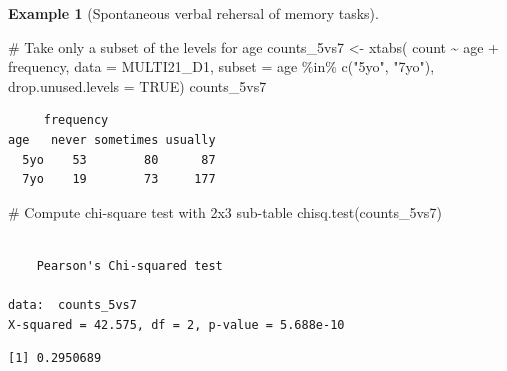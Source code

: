\documentclass[
  11pt,
  letterpaper,
]{scrbook}
\newenvironment{Shaded}{\begin{snugshade}}{\end{snugshade}}
\newcommand{\AttributeTok}[1]{\textcolor[rgb]{0.40,0.45,0.13}{#1}}
\newcommand{\CommentTok}[1]{\textcolor[rgb]{0.37,0.37,0.37}{#1}}
\newcommand{\ConstantTok}[1]{\textcolor[rgb]{0.56,0.35,0.01}{#1}}
\newcommand{\FunctionTok}[1]{\textcolor[rgb]{0.28,0.35,0.67}{#1}}
\newcommand{\NormalTok}[1]{\textcolor[rgb]{0.00,0.23,0.31}{#1}}
\newcommand{\OtherTok}[1]{\textcolor[rgb]{0.00,0.23,0.31}{#1}}
\newcommand{\SpecialCharTok}[1]{\textcolor[rgb]{0.37,0.37,0.37}{#1}}
\newcommand{\StringTok}[1]{\textcolor[rgb]{0.13,0.47,0.30}{#1}}
\theoremstyle{definition}
\newtheorem{example}{Example}[chapter]
\theoremstyle{definition}
\theoremstyle{remark}
\begin{document}
\begin{example}[Spontaneous verbal rehersal of memory
tasks]
\begin{Shaded}
\begin{Highlighting}[]
\CommentTok{\# Take only a subset of the levels for age}
\NormalTok{counts\_5vs7 }\OtherTok{\textless{}{-}} \FunctionTok{xtabs}\NormalTok{(}
\NormalTok{  count }\SpecialCharTok{\textasciitilde{}}\NormalTok{ age }\SpecialCharTok{+}\NormalTok{ frequency, }
  \AttributeTok{data =}\NormalTok{ MULTI21\_D1,}
  \AttributeTok{subset =}\NormalTok{ age }\SpecialCharTok{\%in\%} \FunctionTok{c}\NormalTok{(}\StringTok{"5yo"}\NormalTok{, }\StringTok{"7yo"}\NormalTok{),}
  \AttributeTok{drop.unused.levels =} \ConstantTok{TRUE}\NormalTok{)}
\NormalTok{counts\_5vs7}
\end{Highlighting}
\end{Shaded}

\begin{verbatim}
     frequency
age   never sometimes usually
  5yo    53        80      87
  7yo    19        73     177
\end{verbatim}

\begin{Shaded}
\begin{Highlighting}[]
\CommentTok{\# Compute chi{-}square test with 2x3 sub{-}table}
\FunctionTok{chisq.test}\NormalTok{(counts\_5vs7)}
\end{Highlighting}
\end{Shaded}

\begin{verbatim}

    Pearson's Chi-squared test

data:  counts_5vs7
X-squared = 42.575, df = 2, p-value = 5.688e-10
\end{verbatim}

\begin{Shaded}
\end{Shaded}

\begin{verbatim}
[1] 0.2950689
\end{verbatim}

\end{example}
\end{document}
